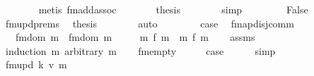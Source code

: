 \begin{isabellebody}
\ \ \ \ \ \ \isamarkupfalse%
\ {\isacharparenleft}{\kern0pt}metis\ fmadd{\isacharunderscore}{\kern0pt}assoc{\isacharparenright}{\kern0pt}\isanewline
\ \ \ \ \isamarkupfalse%
\ \isamarkupfalse%
\ {\isacharquery}{\kern0pt}thesis\isanewline
\ \ \ \ \ \ \isamarkupfalse%
\ simp\isanewline
\ \ \isamarkupfalse%
\isanewline
\ \ \ \ \isamarkupfalse%
\ False\isanewline
\ \ \ \ \isamarkupfalse%
\ fmupd{\isachardot}{\kern0pt}prems\ \isamarkupfalse%
\ {\isacharquery}{\kern0pt}thesis\isanewline
\ \ \ \ \ \ \isamarkupfalse%
\ auto\isanewline
\ \ \isamarkupfalse%
\isanewline
\ \ \isamarkupfalse%
\ \isamarkupfalse%
\ {\isacharquery}{\kern0pt}case\ \isacommand{{\isachardot}{\kern0pt}}\isamarkupfalse%
\isanewline
{}\isamarkupfalse%
%
\endisatagproof
{\isafoldproof}%
%
\isadelimproof
\isanewline
%
\endisadelimproof
\isanewline
{}\isamarkupfalse%
\ fmap{\isacharunderscore}{\kern0pt}disj{\isacharunderscore}{\kern0pt}comm{\isacharcolon}{\kern0pt}\isanewline
\ \ \ {\isachardoublequoteopen}fmdom{\isacharprime}{\kern0pt}\ m\ {\isasyminter}\ fmdom{\isacharprime}{\kern0pt}\ m\ {\isacharequal}{\kern0pt}\ {\isacharbraceleft}{\kern0pt}{\isacharbraceright}{\kern0pt}{\isachardoublequoteclose}\isanewline
\ \ \ {\isachardoublequoteopen}m\ {\isacharplus}{\kern0pt}{\isacharplus}{\kern0pt}\isactrlsub f\ m\ {\isacharequal}{\kern0pt}\ m\ {\isacharplus}{\kern0pt}{\isacharplus}{\kern0pt}\isactrlsub f\ m\isanewline
%
\isadelimproof
\ \ %
\endisadelimproof
%
\isatagproof
{}\isamarkupfalse%
\ assms\isanewline
{}\isamarkupfalse%
\ {\isacharparenleft}{\kern0pt}induction\ m\ arbitrary{\isacharcolon}{\kern0pt}\ m\isanewline
\ \ \isamarkupfalse%
\ fmempty\isanewline
\ \ \isamarkupfalse%
\ \isamarkupfalse%
\ {\isacharquery}{\kern0pt}case\isanewline
\ \ \ \ \isamarkupfalse%
\ simp\isanewline
{}\isamarkupfalse%
\isanewline
\ \ \isamarkupfalse%
\ {\isacharparenleft}{\kern0pt}fmupd\ k\ v\ m\isanewline

\end{isabellebody}
